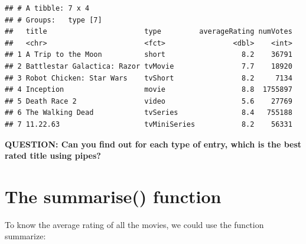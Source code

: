 \documentclass[]{book}
\newenvironment{Shaded}{\begin{snugshade}}{\end{snugshade}}
\newcommand{\DataTypeTok}[1]{\textcolor[rgb]{0.13,0.29,0.53}{#1}}
\newcommand{\KeywordTok}[1]{\textcolor[rgb]{0.13,0.29,0.53}{\textbf{#1}}}
\newcommand{\NormalTok}[1]{#1}
\newcommand{\OperatorTok}[1]{\textcolor[rgb]{0.81,0.36,0.00}{\textbf{#1}}}
\newcommand{\StringTok}[1]{\textcolor[rgb]{0.31,0.60,0.02}{#1}}
\begin{document}
\begin{Shaded}
\end{Shaded}

\begin{verbatim}
## # A tibble: 7 x 4
## # Groups:   type [7]
##   title                       type         averageRating numVotes
##   <chr>                       <fct>                <dbl>    <int>
## 1 A Trip to the Moon          short                  8.2    36791
## 2 Battlestar Galactica: Razor tvMovie                7.7    18920
## 3 Robot Chicken: Star Wars    tvShort                8.2     7134
## 4 Inception                   movie                  8.8  1755897
## 5 Death Race 2                video                  5.6    27769
## 6 The Walking Dead            tvSeries               8.4   755188
## 7 11.22.63                    tvMiniSeries           8.2    56331
\end{verbatim}

\textbf{QUESTION: Can you find out for each type of entry, which is the best rated title using pipes?}

\begin{Shaded}
\end{Shaded}

\hypertarget{the-summarise-function}{%
\section{The summarise() function}\label{the-summarise-function}}

To know the average rating of all the movies, we could use the function summarize:

\begin{Shaded}
\end{Shaded}
\end{document}
